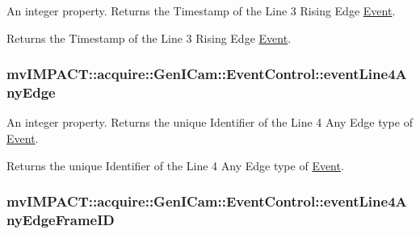 An integer property. Returns the Timestamp of the Line 3 Rising Edge \hyperlink{classmv_i_m_p_a_c_t_1_1acquire_1_1_event}{Event}. 

Returns the Timestamp of the Line 3 Rising Edge \hyperlink{classmv_i_m_p_a_c_t_1_1acquire_1_1_event}{Event}. \hypertarget{classmv_i_m_p_a_c_t_1_1acquire_1_1_gen_i_cam_1_1_event_control_ac00daec6a65198054205a9f152482cf7}{
\subsubsection[{event\+Line4\+Any\+Edge}]{ mv\+I\+M\+P\+A\+C\+T\+::acquire\+::\+Gen\+I\+Cam\+::\+Event\+Control\+::event\+Line4\+Any\+Edge}}\label{classmv_i_m_p_a_c_t_1_1acquire_1_1_gen_i_cam_1_1_event_control_ac00daec6a65198054205a9f152482cf7}


An integer property. Returns the unique Identifier of the Line 4 Any Edge type of \hyperlink{classmv_i_m_p_a_c_t_1_1acquire_1_1_event}{Event}. 

Returns the unique Identifier of the Line 4 Any Edge type of \hyperlink{classmv_i_m_p_a_c_t_1_1acquire_1_1_event}{Event}. \hypertarget{classmv_i_m_p_a_c_t_1_1acquire_1_1_gen_i_cam_1_1_event_control_aed0e28fb21689ea4706e3f8ff70c5911}{
\subsubsection[{event\+Line4\+Any\+Edge\+Frame\+I\+D}]{ mv\+I\+M\+P\+A\+C\+T\+::acquire\+::\+Gen\+I\+Cam\+::\+Event\+Control\+::event\+Line4\+Any\+Edge\+Frame\+I\+D}}\label{classmv_i_m_p_a_c_t_1_1acquire_1_1_gen_i_cam_1_1_event_control_aed0e28fb21689ea4706e3f8ff70c5911}


